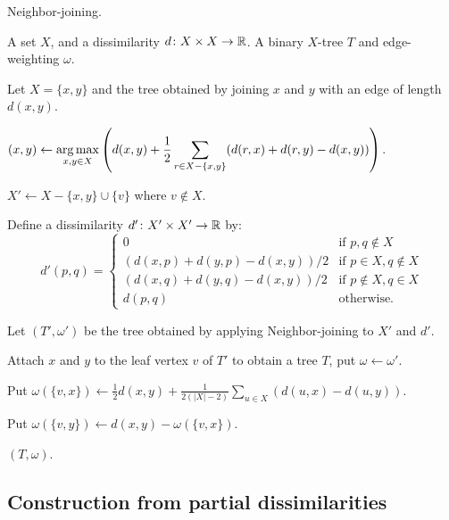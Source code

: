 \begin{algorithm}[h]
  \caption{Neighbor-joining.}
  \label{alg:neighbour-joining}

  \begin{algorithmic}
    \Require A set $X$, and a dissimilarity $d \colon X \times X \to {\mathbb R}$.
    \Ensure  A binary $X$-tree $T$ and edge-weighting $\omega$.

     Let $X = \{x,y\}$ and \Return the tree obtained by joining
    $x$ and $y$ with an edge of length $d(x,y)$.
    \EndIf

    \State $\displaystyle (x,y) \gets \operatorname*{arg\,max}_{x,y \in X} \left( d(x,y) + \frac{1}{2}
    \sum_{r \in X - \{x,y\}} (d(r,x)+d(r,y)-d(x,y))\right)$.

    \State $X' \gets X - \{x,y\} \cup \{v\}$ where $v \notin X$.

    \State Define a dissimilarity $d' \colon X' \times X' \to {\mathbb R}$ by:
    \begin{equation*}
      d'(p,q) =
      \begin{cases}
        0 & \text{if $p,q \notin X$} \\
        (d(x,p)+d(y,p)-d(x,y))/2 & \text{if $p \in X, q \notin X$} \\
        (d(x,q)+d(y,q)-d(x,y))/2 & \text{if $p \notin X, q \in X$} \\
        d(p,q) & \text{otherwise.}
      \end{cases}
    \end{equation*}

    \State Let $(T',\omega')$ be the tree obtained by applying
    Neighbor-joining to $X'$ and $d'$.

    \State Attach $x$ and $y$ to the leaf vertex $v$ of $T'$ to obtain a tree
    $T$, put $\omega \gets \omega'$.

    \State Put $\displaystyle \omega(\{v,x\}) \gets \frac{1}{2} d(x,y) +
    \frac{1}{2(|X|-2)} \sum_{u \in X} (d(u,x)-d(u,y))$.

    \State Put $\omega(\{v,y\}) \gets d(x,y) - \omega(\{v,x\})$.

    \State \Return $(T,\omega)$.
  \end{algorithmic}
\end{algorithm}

\subsection{Construction from partial dissimilarities}
\label{sec:constr-from-part}

